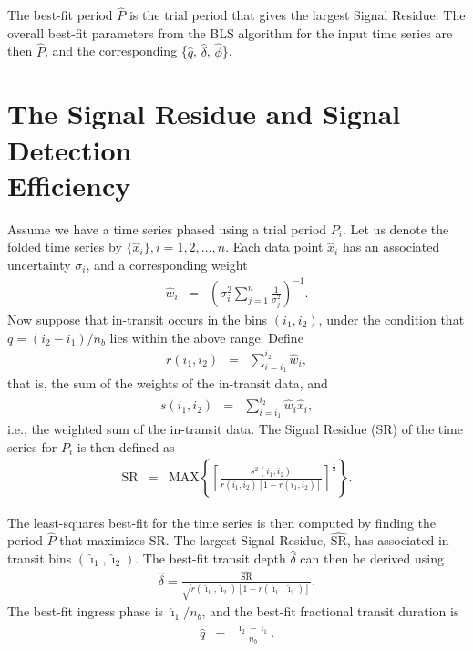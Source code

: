 The best-fit period $\hat{P}$ is the trial period that gives the largest Signal Residue.
The overall best-fit parameters from the BLS algorithm for the input time series are then $\hat{P}$, and the corresponding \{$\hat{q}$, $\hat{\delta}$, $\hat{\phi}$\}.

\section[The Signal Residue and Signal Detection Efficiency]{The Signal Residue and Signal Detection \\ Efficiency}\label{cha:bls:sec:defs}

Assume we have a time series phased using a trial period $P_{i}$.
Let us denote the folded time series by $\{ \hat{x}_{i} \}, i=1,2,\ldots,n$.
Each data point $\hat{x}_{i}$ has an associated uncertainty $\sigma_{i}$, and a corresponding weight
\begin{eqnarray*}
\hat{w}_{i} & = & \left( \sigma_{i}^{2} \sum_{j=1}^{n} \frac{1}{\sigma_{j}^{2}} \right)^{-1}.%
\end{eqnarray*}
Now suppose that in-transit occurs in the bins $(i_{1}, i_{2})$, under the condition that $q = (i_{2} - i_{1})/n_{b}$ lies within the above range. Define
\begin{eqnarray*}
r(i_{1},i_{2}) & = & \sum_{i=i_{1}}^{i_{2}} \hat{w}_{i},
\end{eqnarray*}
that is, the sum of the weights of the in-transit data, and
\begin{eqnarray*}
s(i_{1},i_{2}) & = & \sum_{i=i_{1}}^{i_{2}} \hat{w}_{i} \hat{x}_{i},
\end{eqnarray*}
i.e., the weighted sum of the in-transit data.
The Signal Residue (SR) of the time series for $P_{i}$ is then defined as
\begin{eqnarray*}
\mathrm{SR} & = & \mathrm{MAX} \left\{ \left[ \frac{s^{2}(i_{1},i_{2})}{r(i_{1},i_{2})[1-r(i_{1},i_{2})]} \right]^{\frac{1}{2}} \right\}.%
\end{eqnarray*}

The least-squares best-fit for the time series is then computed by finding the period $\hat{P}$ that maximizes SR.\@
The largest Signal Residue, $\hat{\mathrm{SR}}$, has associated in-transit bins $(\hat{\imath}_{1}, \hat{\imath}_{2})$.
The best-fit transit depth $\hat{\delta}$ can then be derived using
\begin{eqnarray*}
\hat{\delta} = \frac{\hat{\mathrm{SR}}}{\sqrt{r(\hat{\imath}_{1}, \hat{\imath}_{2})[1-r(\hat{\imath}_{1}, \hat{\imath}_{2})]}}.
\end{eqnarray*}
The best-fit ingress phase is $ \hat{\imath}_{1}/n_{b}$, and the best-fit fractional transit duration is
\begin{eqnarray*}
\hat{q} & = & \frac{\hat{\imath}_{2} - \hat{\imath}_{1}}{n_{b}}.
\end{eqnarray*}

